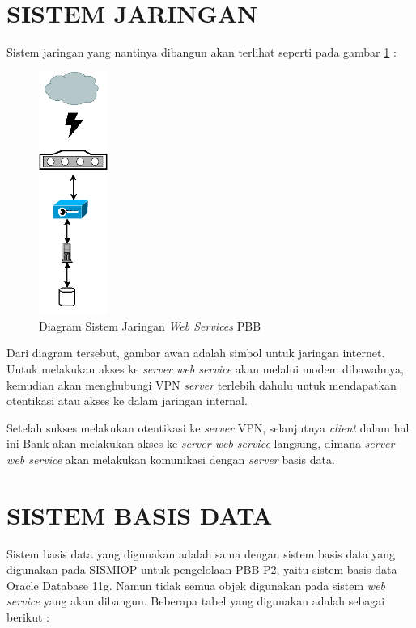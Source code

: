\documentclass[pdftex,12pt, oneside]{article}
\begin{document}
\section{SISTEM JARINGAN}

Sistem jaringan yang nantinya dibangun akan terlihat seperti pada gambar \ref{fig:network-diagram} :

\begin{figure}[H]
  \centering
  \includegraphics[width=0.2\textwidth]{./resources/diagram/network-diagram}
  \caption{Diagram Sistem Jaringan \textit{Web Services} PBB}
  \label{fig:network-diagram}
\end{figure}

Dari diagram tersebut, gambar awan adalah simbol untuk jaringan internet. Untuk melakukan akses ke \textit{server web service} akan melalui modem dibawahnya, kemudian akan menghubungi VPN \textit{server} terlebih dahulu untuk mendapatkan otentikasi atau akses ke dalam jaringan internal.

Setelah sukses melakukan otentikasi ke \textit{server} VPN, selanjutnya \textit{client} dalam hal ini Bank akan melakukan akses ke \textit{server web service} langsung, dimana \textit{server web service} akan melakukan komunikasi dengan \textit{server} basis data.

\section{SISTEM BASIS DATA}

Sistem basis data yang digunakan adalah sama dengan sistem basis data yang digunakan pada SISMIOP untuk pengelolaan PBB-P2, yaitu sistem basis data Oracle Database 11g. Namun tidak semua objek digunakan pada sistem \textit{web service} yang akan dibangun. Beberapa tabel yang digunakan adalah sebagai berikut :
\end{document}
